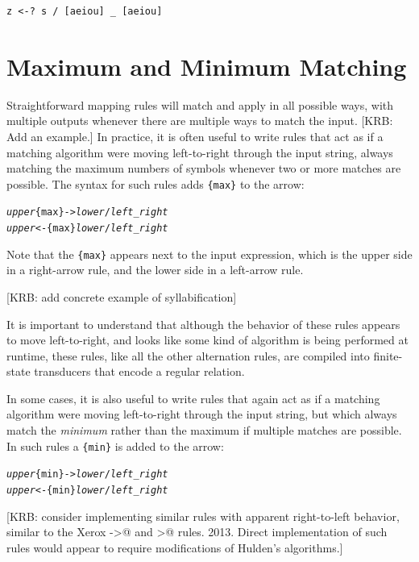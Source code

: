 \begin{Verbatim}
z <-? s / [aeiou] _ [aeiou]
\end{Verbatim}

\section{Maximum and Minimum Matching}

Straightforward mapping rules will match and apply in all possible ways, with multiple outputs
whenever there are multiple ways to match the input.  [KRB:  Add an example.]  In practice, it is often useful to write rules that act as
if a matching algorithm were moving left-to-right through the input string, always matching the
	maximum numbers of symbols whenever two or more matches are possible.  The syntax for such rules
	adds \verb!{max}! to the arrow:

\begin{alltt}
\emph{upper} \{max\}-> \emph{lower} / \emph{left} _ \emph{right}
\emph{upper} <-\{max\} \emph{lower} / \emph{left} _ \emph{right}
\end{alltt}

\noindent
Note that the \verb!{max}! appears next to the input expression, which is the upper side in a right-arrow rule, and the lower side
in a left-arrow rule.

[KRB: add concrete example of syllabification]  

It is important to understand that although the behavior of these rules appears to move
left-to-right, and looks like some kind of algorithm is being performed at runtime, these
rules, like all the other alternation rules, are compiled into finite-state transducers
that encode a regular relation.

In some cases, it is also useful to write rules that again act as if a matching algorithm
were moving left-to-right through the input string, but which always match the
\emph{minimum} rather than the maximum if multiple matches are possible.  In such rules a
\verb!{min}! is added to the arrow:

\begin{alltt}
\emph{upper} \{min\}-> \emph{lower} / \emph{left} _ \emph{right}
\emph{upper} <-\{min\} \emph{lower} / \emph{left} _ \emph{right}
\end{alltt}

[KRB:  consider implementing similar rules with apparent right-to-left
behavior, similar to the Xerox ->@ and >@ rules.  2013.  Direct
implementation of such rules would appear to require modifications of
Hulden's algorithms.]


